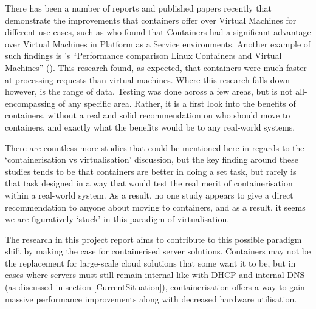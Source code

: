 
There has been a number of reports and published papers recently that demonstrate the improvements that containers offer over Virtual Machines for different use cases, such as \citet{dua14} who found that Containers had a significant advantage over Virtual Machines in Platform as a Service environments. Another example of such findings is \citeauthor{joy15}'s ``Performance comparison Linux Containers and Virtual Machines'' (\citeyear{joy15}). This research found, as expected, that containers were much faster at processing requests than virtual machines. Where this research falls down however, is the range of data. Testing was done across a few areas, but is not all-encompassing of any specific area. Rather, it is a first look into the benefits of containers, without a real and solid recommendation on who should move to containers, and exactly what the benefits would be to any real-world systems.

There are countless more studies that could be mentioned here in regards to the `containerisation vs virtualisation' discussion, but the key finding around these studies tends to be that containers are better in doing a set task, but rarely is that task designed in a way that would test the real merit of containerisation within a real-world system. As a result, no one study appears to give a direct recommendation to anyone about moving to containers, and as a result, it seems we are figuratively `stuck' in this paradigm of virtualisation.

The research in this project report aims to contribute to this possible paradigm shift by making the case for containerised server solutions. Containers may not be the replacement for large-scale cloud solutions that some want it to be, but in cases where servers must still remain internal like with DHCP and internal DNS (as discussed in section \ref{CurrentSituation}), containerisation offers a way to gain massive performance improvements along with decreased hardware utilisation.

